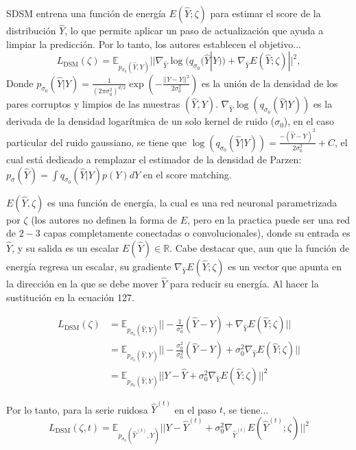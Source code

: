 \documentclass[12pt,letterpaper]{article}
\begin{document}
SDSM entrena una función de energía $E(\hat{Y};\zeta)$ para estimar el score de la distribución $\hat{Y}$, lo que permite aplicar un paso de actualización que ayuda a limpiar la predicción. Por lo tanto, los autores \cite{li2022generative} establecen el objetivo...
\begin{equation}
    L_{\text{DSM}}( \zeta)=\mathbb{E}_{p_{\sigma_0}(\hat{Y},Y)} || \nabla_{\hat{Y}}\log(q_{\sigma_0}(\hat{Y}|Y)) + \nabla_{\hat{Y}}E(\hat{Y};\zeta)||^{2},
\end{equation}
Donde $p_{\sigma_0}(\hat{Y}|Y)=\frac{1}{(2\pi\sigma_0^2)^{d/2}}\exp(-\frac{||\hat{Y}-Y||^2}{2\sigma_0^2})$ es la unión de la densidad de los pares corruptos y limpios de las muestras $(\hat{Y},Y)$. $\nabla_{\hat{Y}} \log(q_{\sigma_0}(\hat{Y}|Y))$ es la derivada de la densidad logarítmica de un solo kernel de ruido ($\sigma_0$), en el caso particular del ruido gaussiano, se tiene que $\log(q_{\sigma_0}(\hat{Y}|Y) )=\frac{-(\hat{Y}-Y)^{2}}{2\sigma_0^2}+C$, el cual está dedicado a remplazar el estimador de la densidad de Parzen: $p_{\sigma}(\hat{Y})=\int q_{\sigma_0}(\hat{Y}|Y)p(Y) dY$ en el score matching.

$E(\hat{Y}, \zeta)$ es una función de energía, la cual es una red neuronal parametrizada por $\zeta$ (los autores no definen la forma de $E$, pero en la practica puede ser una red de $2-3$ capas completamente conectadas o convolucionales), donde su entrada es $\hat{Y}$, y su salida es un escalar $E(\hat{Y})\in \mathbb{R}$. Cabe destacar que, aun que la función de energía regresa un escalar, su gradiente $\nabla_{\hat{Y}}E(\hat{Y};\zeta)$ es un vector que apunta en la dirección en la que se debe mover $\hat{Y}$ para reducir su energía. Al hacer la sustitución en la ecuación 127.

\begin{align}
L_{\text{DSM}}( \zeta) &= \mathbb{E}_{p_{\sigma_0}(\hat{Y},Y)} || -\frac{1}{\sigma_0^2}(\hat{Y}-Y)+\nabla_{\hat{Y}}E(\hat{Y};\zeta)||\\
  &= \mathbb{E}_{p_{\sigma_0}(\hat{Y},Y)} || -\frac{\sigma_0^2}{\sigma_0^2}(\hat{Y}-Y)+\sigma_0^2\nabla_{\hat{Y}}E(\hat{Y};\zeta)||\\
  &=  \mathbb{E}_{p_{\sigma_0}(\hat{Y},Y)}|| Y - \hat{Y}+ \sigma_0^2 \nabla_{\hat{Y}}E(\hat{Y};\zeta)||^{2}
\end{align}

Por lo tanto, para la serie ruidosa $\hat{Y}^{(t)}$ en el paso $t$, se tiene...
\begin{equation}
    L_{\text{DSM}}(\zeta, t) = \mathbb{E}_{p_{\sigma_0}(\hat{Y}^{(t)},Y)}|| Y - \hat{Y}^{(t)}+ \sigma_0^2 \nabla_{\hat{Y}^{(t)}}E(\hat{Y}^{(t)};\zeta)||^{2}
\end{equation}
\end{document}

